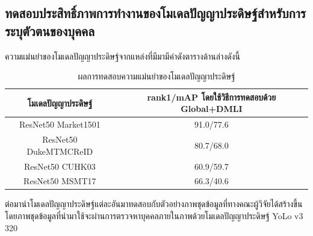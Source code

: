 \subsection{ทดสอบประสิทธิ์ภาพการทำงานของโมเดลปัญญาประดิษฐ์สำหรับการระบุตัวตนของบุคคล}
ความแม่นยำของโมเดลปัญญาประดิษฐ์จากแหล่งที่มีมามีค่าดังตารางด้านล่างดังนี้
\begin{table}[!ht]
\centering
\begin{tabular}{|c|c|}
		\hline
		{โมเดลปัญญาประดิษฐ์}&{rank1/mAP โดยใช้วิธีการทดสอบด้วย Global+DMLI}				\\
		\hline
		ResNet50 Market1501	 			& 91.0/77.6								\\
		ResNet50 DukeMTMCReID			& 80.7/68.0								\\
		ResNet50 CUHK03				& 60.9/59.7								\\
		ResNet50 MSMT17				& 66.3/40.6								\\
	\hline
\end{tabular}
\caption{ผลการทดสอบความแม่นยำของโมเดลปัญญาประดิษฐ์}
\label{tab: Accuracy of model ReID}
\end{table}
ต่อมานำโมเดลปัญญาประดิษฐ์แต่ละอันมาทดสอบกับตัวอย่างภาพชุดข้อมูลที่ทางคณะผู้วิจัยได้สร้างขึ้น โดยภาพชุดข้อมูลที่นำมาใช้จะผ่านการตรวจหาบุคคลภายในภาพด้วยโมเดลปัญญาประดิษฐ์ YoLo v3 320
